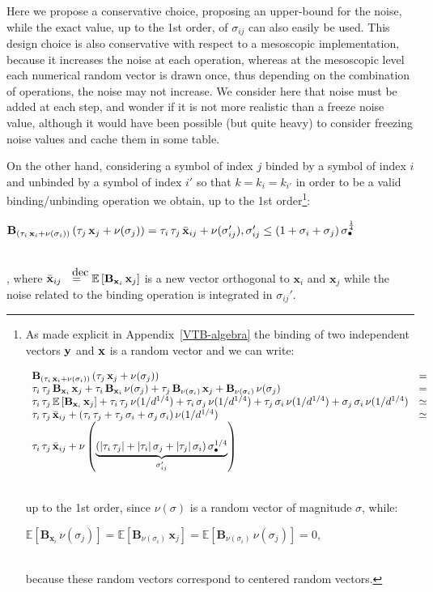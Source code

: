 \documentclass[sn-mathphys]{sn-jnl}
\newcommand{\eqline}[1]{~\vspace{0.1cm}\\\centerline{$#1$}\vspace{0.1cm}\\}
\begin{document}
\begin{appendices}
Here we propose a conservative choice, proposing an upper-bound for the noise, while the exact value, up to the 1st order, of $\sigma_{ij}$ can also easily be used. This design choice is also conservative with respect to a mesoscopic implementation, because it increases the noise at each operation, whereas at the mesoscopic level each numerical random vector is drawn once, thus depending on the combination of operations, the noise may not increase. We consider here that noise must be added at each step, and wonder if it is not more realistic than a freeze noise value, although it would have been possible (but quite heavy) to consider freezing noise values and cache them in some table.

On the other hand, considering a symbol of index $j$ binded by a symbol of index $i$ and unbinded by a symbol of index $i'$ so that $k = k_i = k_{i'}$ in order to be a valid binding/unbinding operation we obtain, up to the 1st order\footnote{
As made explicit in Appendix~\ref{VTB-algebra} the binding of two independent vectors ${\bf y}$ and ${\bf x}$ is a random vector and we can write:
\eqline{\begin{array}{lc}
    \mathbf{B}_{(\tau_i \, \mathbf{x}_i + \nu(\sigma_i))} \, (\tau_j \, \mathbf{x}_j + \nu(\sigma_j)) &=\\
    \tau_i \, \tau_j \, \mathbf{B}_{\mathbf{x}_i} \, \mathbf{x}_j +
    \tau_i \, \mathbf{B}_{\mathbf{x}_i} \, \nu(\sigma_j) + 
    \tau_j \, \mathbf{B}_{\nu(\sigma_i)} \, \mathbf{x}_j +
    \mathbf{B}_{\nu(\sigma_i)} \, \nu(\sigma_j) &= \\
    \tau_i \, \tau_j \, \mathbb{E}\left[\mathbf{B}_{\mathbf{x}_i} \, \mathbf{x}_j\right] + 
    \tau_i \, \tau_j \, \nu(1/d^{1/4}) +
    \tau_i \, \sigma_j \, \nu(1/d^{1/4}) +
    \tau_j \, \sigma_i \, \nu(1/d^{1/4}) +
    \sigma_j \, \sigma_i \, \nu(1/d^{1/4}) &\simeq \\
    \tau_i \, \tau_j \, \bar{\bf x}_{ij} +
    (\tau_i \, \tau_j + \tau_j \, \sigma_i + \sigma_j \, \sigma_i) \, \nu(1/d^{1/4}) &\simeq \\
    \tau_i \, \tau_j \, \bar{\bf x}_{ij} +
    \nu\left(\underbrace{(\lvert \tau_i \, \tau_j \rvert +  \lvert \tau_i \rvert \, \sigma_j + \lvert \tau_j \rvert \, \sigma_i) \, \sigma_\bullet^{1/4}}_{\sigma_{ij}'}\right)
 \end{array}}
up to the 1st order, since $\nu(\sigma)$ is a random vector of magnitude $\sigma$, while:
\eqline{\mathbb{E}\left[\mathbf{B}_{\mathbf{x}_i} \, \nu(\sigma_j)\right] = \mathbb{E}\left[\mathbf{B}_{\nu(\sigma_i)} \, \mathbf{x}_j\right] = \mathbb{E}\left[\mathbf{B}_{\nu(\sigma_i)} \, \nu(\sigma_j)\right] = 0,}
because these random vectors correspond to centered random vectors.}:
\eqline{\mathbf{B}_{(\tau_i \, \mathbf{x}_i + \nu(\sigma_i))} \, (\tau_j \, \mathbf{x}_j + \nu(\sigma_j)) = \tau_i \, \tau_j \, \bar{\bf x}_{ij} + \nu(\sigma_{ij}'), \sigma_{ij}' \le (1 + \sigma_{i} + \sigma_j) \, \sigma_\bullet^{\frac{1}{4}}},
where $\bar{\bf x}_{ij} \deq \mathbb{E}\left[\mathbf{B}_{\mathbf{x}_i} \, \mathbf{x}_j\right]$ is a new vector orthogonal to $\mathbf{x}_i$ and $\mathbf{x}_j$ while the noise related to the binding operation is integrated in $\sigma_{ij}'$.


\end{appendices}
\end{document}

